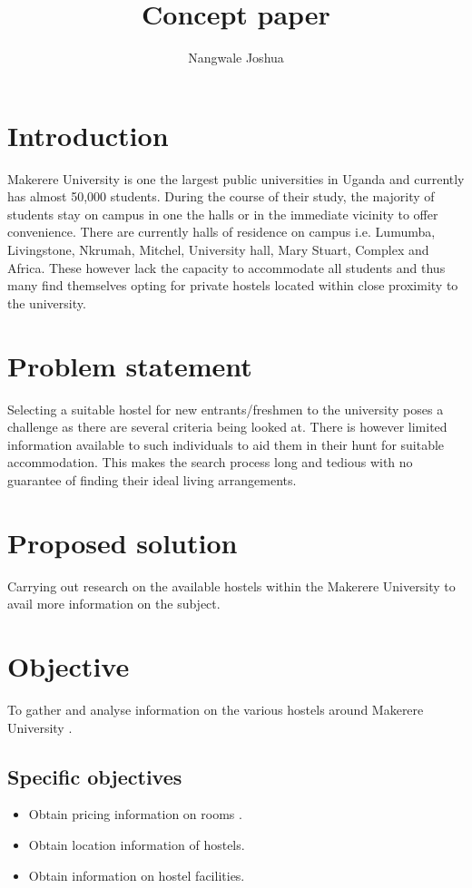 \documentclass{article}
\begin{document}
\title{Concept paper}
\author{Nangwale Joshua}
\maketitle

\section{Introduction}
Makerere University is one the largest public universities in Uganda and currently has almost 50,000 students. During the course of their study, the majority of students stay on campus in one the halls or in the immediate vicinity to offer convenience. There are currently halls of residence on campus i.e. Lumumba, Livingstone, Nkrumah, Mitchel, University hall, Mary Stuart, Complex and Africa. These however lack the capacity to accommodate all students and thus many find themselves opting for private hostels located within close proximity to the university.

\section{Problem statement}
Selecting a suitable hostel for new entrants/freshmen to the university poses a challenge as there are several criteria being looked at. There is however limited information available to such individuals to aid them in their hunt for suitable accommodation. This makes the search process long and tedious with no guarantee of finding their ideal living arrangements.

\section{Proposed solution}
Carrying out research on the available hostels within the Makerere University to avail more information on the subject.

\section{Objective}
To gather and analyse information on the various hostels around  Makerere University .

\subsection{Specific objectives}
\begin{itemize}
\item Obtain pricing information on rooms .
\item Obtain location information of hostels.
\item Obtain information on hostel facilities.
\end{itemize}
\end{document}
